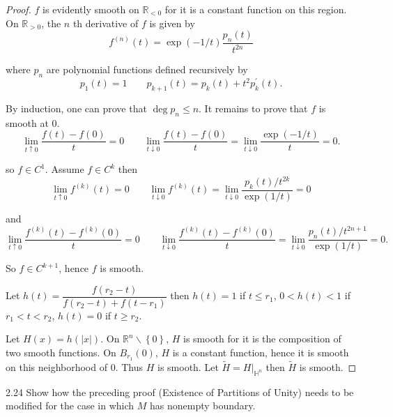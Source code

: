 \begin{proof}
    \( f \) is evidently smooth on \( \mathbb{R}_{< 0} \) for it is a constant function on this region. On \( \mathbb{R}_{> 0} \), the \(n\) th derivative of \( f \) is given by
    \[
        f^{(n)}(t) = \exp(-1/t)\dfrac{p_{n}(t)}{t^{2n}}
    \]

    where \( p_{n} \) are polynomial functions defined recursively by
    \[
        p_{1}(t) = 1 \qquad p_{k+1}(t) = p_{k}(t) + t^{2} p_{k}^{\prime}(t).
    \]

    By induction, one can prove that \( \deg p_{n} \le n \). It remains to prove that \( f \) is smooth at \( 0 \).
    \[
        \lim\limits_{t \uparrow 0} \dfrac{f(t) - f(0)}{t} = 0 \qquad \lim\limits_{t \downarrow 0} \dfrac{f(t) - f(0)}{t} = \lim\limits_{t \downarrow 0} \dfrac{\exp(-1/t)}{t} = 0.
    \]

    so \( f \in C^{1} \). Assume \( f \in C^{k} \) then
    \[
        \lim\limits_{t \uparrow 0} f^{(k)}(t) = 0 \qquad \lim\limits_{t \downarrow 0} f^{(k)}(t) = \lim\limits_{t \downarrow 0} \dfrac{p_{k}(t)/t^{2k}}{\exp(1/t)} = 0
    \]

    and
    \[
        \lim\limits_{t \uparrow 0} \dfrac{f^{(k)}(t) - f^{(k)}(0)}{t} = 0 \qquad \lim\limits_{t \downarrow 0} \dfrac{f^{(k)}(t) - f^{(k)}(0)}{t} = \lim\limits_{t \downarrow 0} \dfrac{p_{n}(t)/t^{2n+1}}{\exp(1/t)} = 0.
    \]

    So \( f \in C^{k+1} \), hence \( f \) is smooth.

    \bigskip

    Let \( h(t) = \dfrac{f(r_{2} - t)}{f(r_{2} - t) + f(t - r_{1})} \) then \( h(t) = 1 \) if \( t \le r_{1} \), \( 0 < h(t) < 1 \) if \( r_{1} < t < r_{2} \), \( h(t) = 0 \) if \( t \ge r_{2} \).

    \bigskip

    Let \( H(x) = h(\left\vert x \right\vert) \). On \( \mathbb{R}^{n} \smallsetminus \left\{0\right\} \), \( H \) is smooth for it is the composition of two smooth functions. On \( B_{r_{1}}(0) \), \( H \) is a constant function, hence it is smooth on this neighborhood of \( 0 \). Thus \( H \) is smooth. Let \( \widetilde{H} = H\vert_{\mathbb{H}^{n}} \) then \( \widetilde{H} \) is smooth.
\end{proof}

\begin{exercise}{2.24}
    Show how the preceding proof (Existence of Partitions of Unity) needs to be modified for the case in which \( M \) has nonempty boundary.
\end{exercise}

